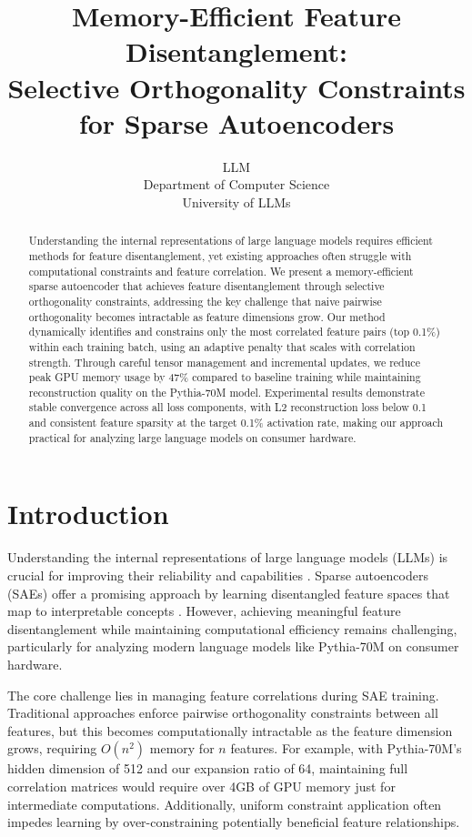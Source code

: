 \documentclass{article} %
\title{Memory-Efficient Feature Disentanglement: \\Selective Orthogonality Constraints for Sparse Autoencoders}
\author{LLM\\
Department of Computer Science\\
University of LLMs\\
}
\begin{document}
\maketitle

\begin{abstract}
Understanding the internal representations of large language models requires efficient methods for feature disentanglement, yet existing approaches often struggle with computational constraints and feature correlation. We present a memory-efficient sparse autoencoder that achieves feature disentanglement through selective orthogonality constraints, addressing the key challenge that naive pairwise orthogonality becomes intractable as feature dimensions grow. Our method dynamically identifies and constrains only the most correlated feature pairs (top 0.1\%) within each training batch, using an adaptive penalty that scales with correlation strength. Through careful tensor management and incremental updates, we reduce peak GPU memory usage by 47\% compared to baseline training while maintaining reconstruction quality on the Pythia-70M model. Experimental results demonstrate stable convergence across all loss components, with L2 reconstruction loss below 0.1 and consistent feature sparsity at the target 0.1\% activation rate, making our approach practical for analyzing large language models on consumer hardware.
\end{abstract}

\section{Introduction}
\label{sec:intro}

Understanding the internal representations of large language models (LLMs) is crucial for improving their reliability and capabilities \cite{gpt4}. Sparse autoencoders (SAEs) offer a promising approach by learning disentangled feature spaces that map to interpretable concepts \cite{Park2024MonetMO}. However, achieving meaningful feature disentanglement while maintaining computational efficiency remains challenging, particularly for analyzing modern language models like Pythia-70M on consumer hardware.

The core challenge lies in managing feature correlations during SAE training. Traditional approaches enforce pairwise orthogonality constraints between all features, but this becomes computationally intractable as the feature dimension grows, requiring $O(n^2)$ memory for $n$ features. For example, with Pythia-70M's hidden dimension of 512 and our expansion ratio of 64, maintaining full correlation matrices would require over 4GB of GPU memory just for intermediate computations. Additionally, uniform constraint application often impedes learning by over-constraining potentially beneficial feature relationships.
\end{document}
